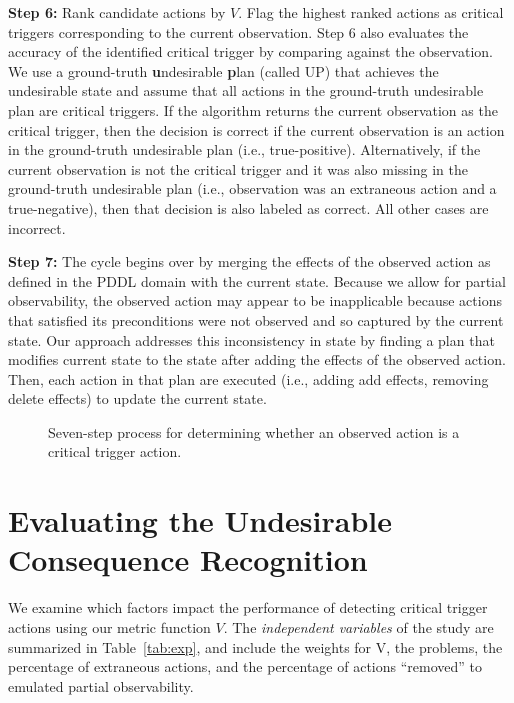 \textbf{Step 6:} Rank candidate actions by $V$. Flag the highest ranked actions as critical triggers corresponding to the current observation. Step 6 also evaluates the accuracy of the identified critical trigger by comparing against the observation. 
We use a ground-truth \textbf{u}ndesirable \textbf{p}lan (called UP) that achieves the undesirable state and assume that all actions in the ground-truth undesirable plan are critical triggers. 
If the algorithm returns the current observation as the critical trigger, then the decision is correct if the current observation is an action in the ground-truth undesirable plan (i.e., true-positive). 
Alternatively, if the current observation is not the critical trigger and it was also missing in the ground-truth undesirable plan (i.e., observation was an extraneous action and a true-negative), then that decision is also labeled as correct. 
All other cases are incorrect.

\textbf{Step 7:} The cycle begins over by merging the effects of the observed action as defined in the PDDL domain with the current state. 
Because we allow for partial observability, the observed action may appear to be inapplicable because actions that satisfied its preconditions were not observed and so captured by the current state. 
Our approach addresses this inconsistency in state by finding a plan that modifies current state to the state after adding the effects of the observed action. 
Then, each action in that plan are executed (i.e., adding add effects, removing delete effects) to update the current state.

\begin{figure}[t]
\caption{Seven-step process for determining whether an observed action is a critical trigger action.}
\label{fig:components}
\end{figure}

\section{Evaluating the Undesirable Consequence Recognition}
We examine which factors impact the performance of detecting critical trigger actions using our metric function $V$. The \emph{independent variables} of the study are summarized in Table~\ref{tab:exp}, and include the weights for V, the problems, the percentage of extraneous actions, and the percentage of actions ``removed'' to emulated partial observability.

